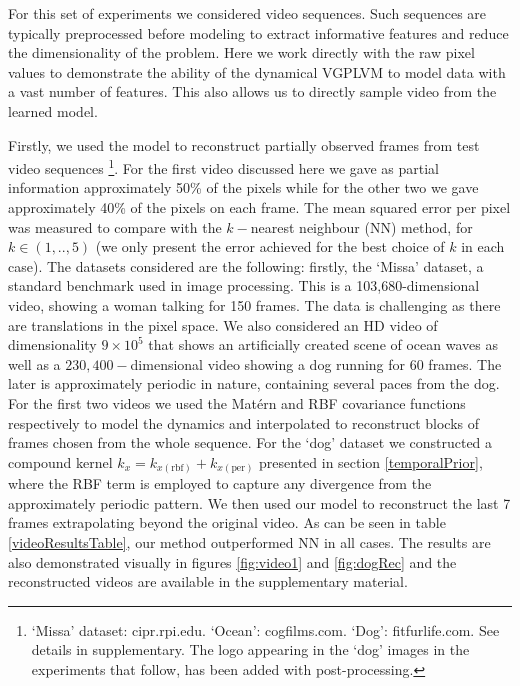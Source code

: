 For this set of experiments we considered video sequences. Such
sequences are typically preprocessed before modeling to extract
informative features and reduce the dimensionality of the
problem. Here we work directly with the raw pixel values to
demonstrate the ability of the dynamical VGPLVM to model data with a vast number
of features. This also allows us to directly sample video from the
learned model.
\par Firstly, we used the
model to reconstruct partially observed frames from test video
sequences
\footnote{`Missa' dataset: cipr.rpi.edu. `Ocean': cogfilms.com. `Dog': fitfurlife.com.
  See details in supplementary. The logo appearing in the `dog' images in the experiments that follow,
  has been added with post-processing.}.
For the first video discussed here we gave as partial information approximately 
50\% of the pixels while for the other two we gave approximately 40\% of the pixels on each frame.
The mean squared error per pixel was measured to compare
with the $k-$nearest neighbour (NN) method, for $k \in (1,..,5)$ (we
only present the error achieved for the best choice of $k$ in each
case). The datasets considered are the following: firstly, the `Missa'
dataset, a standard benchmark used in image
processing. This is a 103,680-dimensional video, showing a woman talking
for 150 frames. The data is challenging as there are translations in
the pixel space. We also considered an HD video of dimensionality $9
\times 10^5$ that shows an artificially created scene of ocean waves
as well as a $230,400-$dimensional video showing
a dog running for $60$ frames. The later is approximately periodic in
nature, containing several paces from the dog. For the first two
videos we used the Mat\'ern and RBF covariance functions respectively to model the
dynamics and interpolated to reconstruct blocks of frames chosen from
the whole sequence. For the `dog' dataset we constructed a compound
kernel $k_x = k_{x(\text{rbf})} + k_{x(\text{per})}$ presented in section \ref{temporalPrior}, where the
RBF term is employed to capture any divergence from the approximately
periodic pattern. We then used our model to reconstruct the last 7
frames extrapolating beyond the original video. As can be seen in
table \ref{videoResultsTable}, our method outperformed NN in all
cases. The results are also demonstrated visually in figures
\ref{fig:video1} and \ref{fig:dogRec} and the reconstructed videos are available in the supplementary material.


